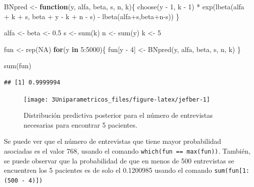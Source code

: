 \documentclass[
  10pt,
  spanish,
]{book}
\newenvironment{Shaded}{\begin{snugshade}}{\end{snugshade}}
\newcommand{\ConstantTok}[1]{\textcolor[rgb]{0.00,0.00,0.00}{#1}}
\newcommand{\ControlFlowTok}[1]{\textcolor[rgb]{0.13,0.29,0.53}{\textbf{#1}}}
\newcommand{\DecValTok}[1]{\textcolor[rgb]{0.00,0.00,0.81}{#1}}
\newcommand{\FloatTok}[1]{\textcolor[rgb]{0.00,0.00,0.81}{#1}}
\newcommand{\FunctionTok}[1]{\textcolor[rgb]{0.00,0.00,0.00}{#1}}
\newcommand{\NormalTok}[1]{#1}
\newcommand{\OtherTok}[1]{\textcolor[rgb]{0.56,0.35,0.01}{#1}}
\newcommand{\SpecialCharTok}[1]{\textcolor[rgb]{0.00,0.00,0.00}{#1}}
\theoremstyle{definition}
\theoremstyle{definition}
\theoremstyle{definition}
\theoremstyle{definition}
\theoremstyle{remark}
\begin{document}
\begin{Shaded}
\begin{Highlighting}[]
\NormalTok{BNpred }\OtherTok{\textless{}{-}} \ControlFlowTok{function}\NormalTok{(y, alfa, beta, s, n, k)\{}
  \FunctionTok{choose}\NormalTok{(y }\SpecialCharTok{{-}} \DecValTok{1}\NormalTok{, k }\SpecialCharTok{{-}} \DecValTok{1}\NormalTok{) }\SpecialCharTok{*}
    \FunctionTok{exp}\NormalTok{(}\FunctionTok{lbeta}\NormalTok{(alfa }\SpecialCharTok{+}\NormalTok{ k }\SpecialCharTok{+}\NormalTok{ s, beta }\SpecialCharTok{+}\NormalTok{ y }\SpecialCharTok{{-}}\NormalTok{ k }\SpecialCharTok{+}\NormalTok{ n }\SpecialCharTok{{-}}\NormalTok{ s) }\SpecialCharTok{{-}}
          \FunctionTok{lbeta}\NormalTok{(alfa}\SpecialCharTok{+}\NormalTok{s,beta}\SpecialCharTok{+}\NormalTok{n}\SpecialCharTok{{-}}\NormalTok{s))}
\NormalTok{\}}

\NormalTok{alfa }\OtherTok{\textless{}{-}}\NormalTok{ beta }\OtherTok{\textless{}{-}} \FloatTok{0.5}
\NormalTok{s }\OtherTok{\textless{}{-}} \FunctionTok{sum}\NormalTok{(k)}
\NormalTok{n }\OtherTok{\textless{}{-}} \FunctionTok{sum}\NormalTok{(y)}
\NormalTok{k }\OtherTok{\textless{}{-}} \DecValTok{5}

\NormalTok{fun }\OtherTok{\textless{}{-}} \FunctionTok{rep}\NormalTok{(}\ConstantTok{NA}\NormalTok{)}
\ControlFlowTok{for}\NormalTok{(y }\ControlFlowTok{in} \DecValTok{5}\SpecialCharTok{:}\DecValTok{5000}\NormalTok{)\{}
\NormalTok{  fun[y }\SpecialCharTok{{-}} \DecValTok{4}\NormalTok{] }\OtherTok{\textless{}{-}} \FunctionTok{BNpred}\NormalTok{(y, alfa, beta, s, n, k)}
\NormalTok{\}}

\FunctionTok{sum}\NormalTok{(fun)}
\end{Highlighting}
\end{Shaded}

\begin{verbatim}
## [1] 0.9999994
\end{verbatim}

\begin{figure}

{\centering \texttt{[image: 3Uniparametricos\_files/figure-latex/jefber-1]} 

}

\caption{Distribución predictiva posterior para el número de entrevistas necesarias para encontrar 5 pacientes.}\label{fig:jefber}
\end{figure}

Se puede ver que el número de entrevistas que tiene mayor probabilidad asociadas es el valor 768, usando el comando \texttt{which(fun\ ==\ max(fun))}. También, se puede observar que la probabilidad de que en menos de 500 entrevistas se encuentren los 5 pacientes es de solo el 0.1200985 usando el comando \texttt{sum(fun{[}1:(500\ -\ 4){]})}
\end{document}
